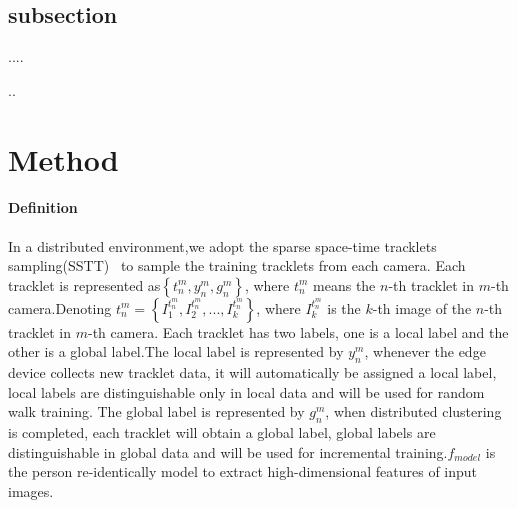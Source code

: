 \documentclass{article}
\begin{document}
\subsection{subsection}
....

..




\section{Method}
\paragraph{Definition} 
In a distributed environment,we adopt the sparse space-time tracklets sampling(SSTT)~\cite{li2018unsupervised} to sample the training tracklets from each camera. Each tracklet is represented as$\left \{t_{n}^{m}, y_{n}^{m}, g_{n}^{m}\right \}$, where $t_{n}^{m}$ means the $n$-th tracklet in $m$-th camera.Denoting $t_{n}^{m}=\left \{  I_{1}^{t_{n}^{m}},  I_{2}^{t_{n}^{m}},...,I_{k}^{t_{n}^{m}} \right \}$, where $I_{k}^{t_{n}^{m}}$ is the $k$-th image of the $n$-th tracklet in $m$-th camera. Each tracklet has two labels, one is a local label and the other is a global label.The local label is represented by $y_{n}^{m}$, whenever the edge device collects new tracklet data, it will automatically be assigned a local label, local labels are distinguishable only in local data and will be used for random walk training. The global label is represented by $g_{n}^{m}$, when distributed clustering is completed, each tracklet will obtain a global label, global labels are distinguishable in global data and will be used for incremental training.$f_{model}$ is the person re-identically model to extract high-dimensional features of input images.
\end{document}
